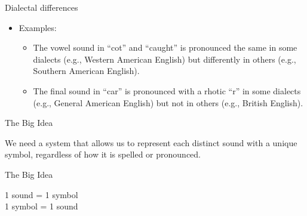 \documentclass[professionalfonts]{beamer}
\begin{document}
\begin{frame}{Dialectal differences}
    \begin{itemize}
        \item Examples:
        \begin{itemize}
            \item The vowel sound in ``cot'' and ``caught'' is pronounced the same in some dialects (e.g., Western American English) but differently in others (e.g., Southern American English).
            \item The final sound in ``car'' is pronounced with a rhotic ``r'' in some dialects (e.g., General American English) but not in others (e.g., British English).
        \end{itemize}

    \end{itemize}
\end{frame}

\begin{frame}{The Big Idea}
    \begin{center}
        \huge We need a system that allows us to represent each distinct sound with a unique symbol, regardless of how it is spelled or pronounced.
    \end{center}
\end{frame}

\begin{frame}{The Big Idea}
    \begin{center}
        \huge 1 sound = 1 symbol \\
        1 symbol = 1 sound
    \end{center}
\end{frame}
\end{document}
